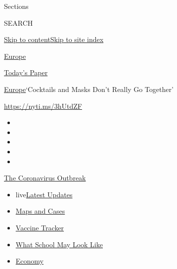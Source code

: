 Sections

SEARCH

\protect\hyperlink{site-content}{Skip to
content}\protect\hyperlink{site-index}{Skip to site index}

\href{https://www.nytimes.com/section/world/europe}{Europe}

\href{https://myaccount.nytimes.com/auth/login?response_type=cookie\&client_id=vi}{}

\href{https://www.nytimes.com/section/todayspaper}{Today's Paper}

\href{/section/world/europe}{Europe}\textbar{}`Cocktails and Masks Don't
Really Go Together'

\url{https://nyti.ms/3hUtdZF}

\begin{itemize}
\item
\item
\item
\item
\item
\end{itemize}

\href{https://www.nytimes.com/news-event/coronavirus?action=click\&pgtype=Article\&state=default\&region=TOP_BANNER\&context=storylines_menu}{The
Coronavirus Outbreak}

\begin{itemize}
\tightlist
\item
  live\href{https://www.nytimes.com/2020/08/01/world/coronavirus-covid-19.html?action=click\&pgtype=Article\&state=default\&region=TOP_BANNER\&context=storylines_menu}{Latest
  Updates}
\item
  \href{https://www.nytimes.com/interactive/2020/us/coronavirus-us-cases.html?action=click\&pgtype=Article\&state=default\&region=TOP_BANNER\&context=storylines_menu}{Maps
  and Cases}
\item
  \href{https://www.nytimes.com/interactive/2020/science/coronavirus-vaccine-tracker.html?action=click\&pgtype=Article\&state=default\&region=TOP_BANNER\&context=storylines_menu}{Vaccine
  Tracker}
\item
  \href{https://www.nytimes.com/interactive/2020/07/29/us/schools-reopening-coronavirus.html?action=click\&pgtype=Article\&state=default\&region=TOP_BANNER\&context=storylines_menu}{What
  School May Look Like}
\item
  \href{https://www.nytimes.com/live/2020/07/31/business/stock-market-today-coronavirus?action=click\&pgtype=Article\&state=default\&region=TOP_BANNER\&context=storylines_menu}{Economy}
\end{itemize}

